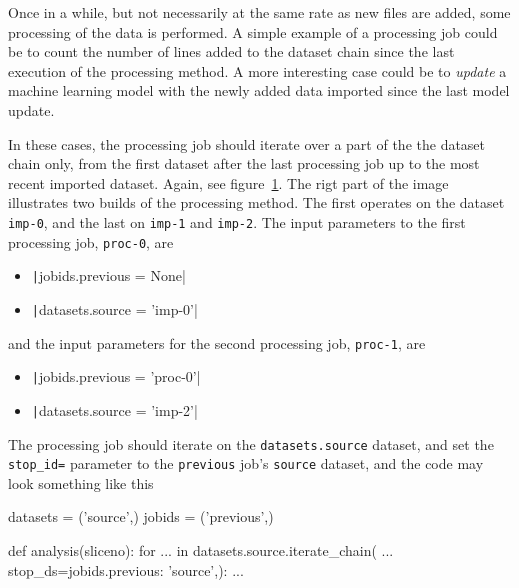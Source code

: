 Once in a while, but not necessarily at the same rate as new files are
added, some processing of the data is performed.  A simple example of
a processing job could be to count the number of lines added to the
dataset chain since the last execution of the processing method.  A
more interesting case could be to \textsl{update} a machine learning
model with the newly added data imported since the last model update.

In these cases, the processing job should iterate over a part of the
the dataset chain only, from the first dataset after the last
processing job up to the most recent imported dataset.  Again, see
figure~\ref{fig:dsprocchain}.  The rigt part of the image illustrates
two builds of the processing method.  The first operates on the
dataset \texttt{imp-0}, and the last on \texttt{imp-1}
and \texttt{imp-2}.  The input parameters to the first processing
job, \texttt{proc-0}, are
\begin{itemize}
\item[] \texttt|jobids.previous = None|
\item[] \texttt|datasets.source = 'imp-0'|
\end{itemize}
and the input parameters for the second processing
job, \texttt{proc-1}, are
\begin{itemize}
\item[] \texttt|jobids.previous = 'proc-0'|
\item[] \texttt|datasets.source = 'imp-2'|
\end{itemize}

The processing job should iterate on the \texttt{datasets.source}
dataset, and set the \texttt{stop\_id=} parameter to
the \texttt{previous} job's \texttt{source} dataset, and the code may
look something like this
\begin{python}
datasets = ('source',)
jobids = ('previous',)

def analysis(sliceno):
    for ... in datasets.source.iterate_chain(
            ...
            stop_ds={jobids.previous: 'source',}):
    ...
\end{python}




\begin{figure}[h!]
  \begin{center}
    
    \caption{}
    \label{fig:dsprocchain}
  \end{center}
\end{figure}







